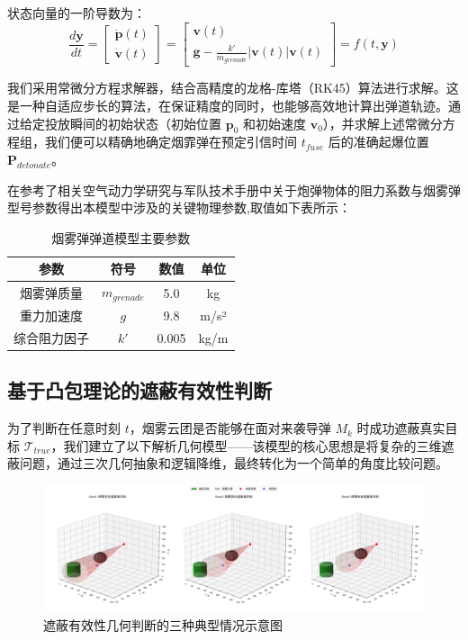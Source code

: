 \documentclass[fontset=SimSun]{ctexart}
\begin{document}
状态向量的一阶导数为：
\begin{equation}
\frac{d\mathbf{y}}{dt} = \begin{bmatrix} \dot{\mathbf{p}}(t) \\ \dot{\mathbf{v}}(t) \end{bmatrix} = \begin{bmatrix} \mathbf{v}(t) \\ \mathbf{g} - \frac{k'}{m_{grenade}} |\mathbf{v}(t)| \mathbf{v}(t) \end{bmatrix} = f(t, \mathbf{y})
\label{eq:state_space_ode}
\end{equation}

我们采用常微分方程求解器，结合高精度的龙格-库塔（RK45）算法进行求解。这是一种自适应步长的算法，在保证精度的同时，也能够高效地计算出弹道轨迹。通过给定投放瞬间的初始状态（初始位置 $\mathbf{p}_0$ 和初始速度 $\mathbf{v}_0$），并求解上述常微分方程组，我们便可以精确地确定烟霏弹在预定引信时间 $t_{fuse}$ 后的准确起爆位置 $\mathbf{P}_{detonate}$。

在参考了相关空气动力学研究\cite{ref_drag_coeff}与军队技术手册\cite{ref_ammo_data}中关于炮弹物体的阻力系数与烟雾弹型号参数得出本模型中涉及的关键物理参数,取值如下表所示：

\begin{table}[H]
\centering
\caption{烟雾弹弹道模型主要参数}
\begin{tabularx}{0.9\textwidth}{c C c c}
\toprule
\textbf{参数} & \textbf{符号} & \textbf{数值} & \textbf{单位} \\
\midrule
烟雾弹质量 & $m_{grenade}$ & 5.0 & kg \\
重力加速度 & $g$ & 9.8 & m/s² \\
综合阻力因子 & $k'$ & 0.005 & kg/m \\
\bottomrule
\end{tabularx}
\label{tab:grenade_params}
\end{table}
\subsection{基于凸包理论的遮蔽有效性判断}

为了判断在任意时刻 $t$，烟雾云团是否能够在面对来袭导弹 $M_k$ 时成功遮蔽真实目标 $\mathcal{T}_{true}$，我们建立了以下解析几何模型——该模型的核心思想是将复杂的三维遮蔽问题，通过三次几何抽象和逻辑降维，最终转化为一个简单的角度比较问题。

\begin{figure}[H]
    \centering
    \includegraphics[width=\textwidth]{1.遮蔽效果对比图(三种情况).png}
    \caption{遮蔽有效性几何判断的三种典型情况示意图}
    \label{fig:obscuration_cases}
\end{figure}
\end{document}
